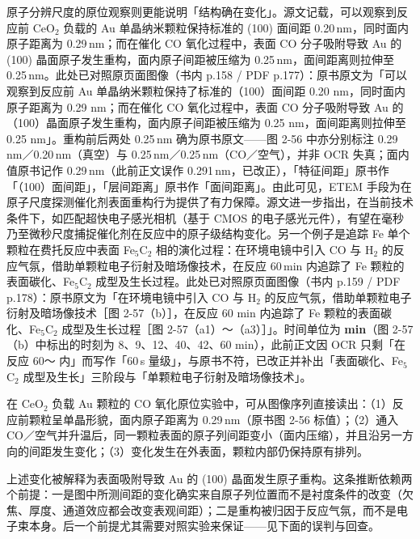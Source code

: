 原子分辨尺度的原位观察则更能说明「结构确在变化」。源文记载，可以观察到反应前 CeO$_2$ 负载的 Au 单晶纳米颗粒保持标准的 (100) 面间距 0.20\,nm，同时面内原子距离为 0.29\,nm；而在催化 CO 氧化过程中，表面 CO 分子吸附导致 Au 的 (100) 晶面原子发生重构，面内原子间距被压缩为 0.25\,nm，面间距离则拉伸至 0.25\,nm。此处已对照原页面图像（书内 p.158 / PDF p.177）：原书原文为「可以观察到反应前 Au 单晶纳米颗粒保持了标准的（100）面间距 0.20 nm，同时面内原子距离为 0.29 nm；而在催化 CO 氧化过程中，表面 CO 分子吸附导致 Au 的（100）晶面原子发生重构，面内原子间距被压缩为 0.25 nm，面间距离则拉伸至 0.25 nm」。重构前后两处 0.25\,nm 确为原书原文——图 2-56 中亦分别标注 0.29\,nm／0.20\,nm（真空）与 0.25\,nm／0.25\,nm（CO／空气），并非 OCR 失真；面内值原书记作 0.29\,nm（此前正文误作 0.291\,nm，已改正），「特征间距」原书作「（100）面间距」，「层间距离」原书作「面间距离」。由此可见，ETEM 手段为在原子尺度探测催化剂表面重构行为提供了有力保障。源文进一步指出，在当前技术条件下，如匹配超快电子感光相机（基于 CMOS 的电子感光元件），有望在毫秒乃至微秒尺度捕捉催化剂在反应中的原子级结构变化。另一个例子是追踪 Fe 单个颗粒在费托反应中表面 Fe$_5$C$_2$ 相的演化过程：在环境电镜中引入 CO 与 H$_2$ 的反应气氛，借助单颗粒电子衍射及暗场像技术，在反应 60\,min 内追踪了 Fe 颗粒的表面碳化、Fe$_5$C$_2$ 成型及生长过程。此处已对照原页面图像（书内 p.159 / PDF p.178）：原书原文为「在环境电镜中引入 CO 与 H$_2$ 的反应气氛，借助单颗粒电子衍射及暗场像技术［图 2-57（b）］，在反应 60 min 内追踪了 Fe 颗粒的表面碳化、Fe$_5$C$_2$ 成型及生长过程［图 2-57（a1）～（a3）］」。时间单位为 \textbf{min}（图 2-57（b）中标出的时刻为 8、9、12、40、42、60 min），此前正文因 OCR 只剩「在反应 60～ 内」而写作「60\,s 量级」，与原书不符，已改正并补出「表面碳化、Fe$_5$C$_2$ 成型及生长」三阶段与「单颗粒电子衍射及暗场像技术」。

\begin{obs}
在 CeO$_2$ 负载 Au 颗粒的 CO 氧化原位实验中，可从图像序列直接读出：（1）反应前颗粒呈单晶形貌，面内原子距离为 0.29\,nm（原书图 2-56 标值）；（2）通入 CO／空气并升温后，同一颗粒表面的原子列间距变小（面内压缩），并且沿另一方向的间距发生变化；（3）变化发生在外表面，颗粒内部仍保持原有排列。
\end{obs}

\begin{infer}
上述变化被解释为表面吸附导致 Au 的 (100) 晶面发生原子重构。这条推断依赖两个前提：一是图中所测间距的变化确实来自原子列位置而不是衬度条件的改变（欠焦、厚度、通道效应都会改变表观间距）；二是重构被归因于反应气氛，而不是电子束本身。后一个前提尤其需要对照实验来保证——见下面的误判与回查。
\end{infer}

